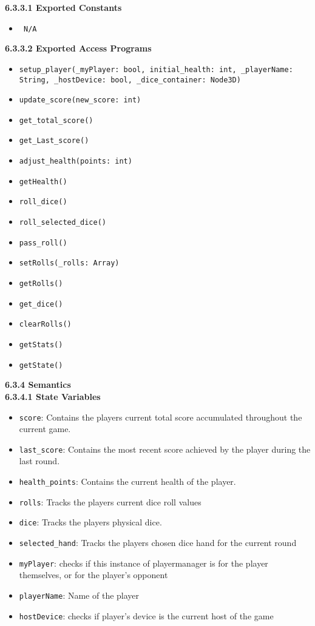 \documentclass[12pt, titlepage]{article}
\begin{document}
\noindent \textbf{6.3.3.1 Exported Constants}
\begin{itemize}
	\item \texttt{ N/A}
\end{itemize}
\textbf{6.3.3.2 Exported Access Programs}
\begin{itemize}
	\item \texttt{setup\_player(\_myPlayer: bool, initial\_health: int, \_playerName: String, \_hostDevice: bool, \_dice\_container: Node3D)}
    \item \texttt{update\_score(new\_score: int)}
    \item \texttt{get\_total\_score()}
    \item \texttt{get\_Last\_score()}
    \item \texttt{adjust\_health(points: int)}
    \item \texttt{getHealth()}
    \item \texttt{roll\_dice()}
    \item \texttt{roll\_selected\_dice()}
    \item \texttt{pass\_roll()}
    \item \texttt{setRolls(\_rolls: Array)}
    \item \texttt{getRolls()}
    \item \texttt{get\_dice()}
    \item \texttt{clearRolls()}
    \item \texttt{getStats()}
    \item \texttt{getState()}
\end{itemize}

\noindent \textbf{6.3.4 Semantics}\\
\textbf{6.3.4.1 State Variables}\\
\begin{itemize}
    \item \texttt{score}: Contains the players current total score accumulated throughout the current game.
    \item \texttt{last\_score}: Contains the most recent score achieved by the player during the last round.
    \item \texttt{health\_points}: Contains the current health of the player.
    \item \texttt{rolls}: Tracks the players current dice roll values
    \item \texttt{dice}: Tracks the players physical dice.
    \item \texttt{selected\_hand}: Tracks the players chosen dice hand for the current round 
    \item \texttt{myPlayer}: checks if this instance of playermanager is for the player themselves, or for the player's opponent
    \item \texttt{playerName}: Name of the player
    \item \texttt{hostDevice}: checks if player's device is the current host of the game
\end{itemize}
\end{document}
